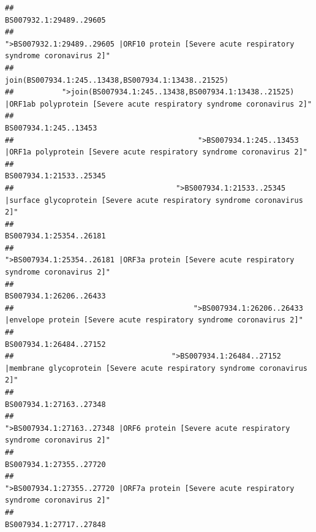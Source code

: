 \documentclass[
]{article}
\begin{document}
\begin{verbatim}
##                                                                                                                BS007932.1:29489..29605 
##                                            ">BS007932.1:29489..29605 |ORF10 protein [Severe acute respiratory syndrome coronavirus 2]" 
##                                                                                    join(BS007934.1:245..13438,BS007934.1:13438..21525) 
##           ">join(BS007934.1:245..13438,BS007934.1:13438..21525) |ORF1ab polyprotein [Severe acute respiratory syndrome coronavirus 2]" 
##                                                                                                                  BS007934.1:245..13453 
##                                          ">BS007934.1:245..13453 |ORF1a polyprotein [Severe acute respiratory syndrome coronavirus 2]" 
##                                                                                                                BS007934.1:21533..25345 
##                                     ">BS007934.1:21533..25345 |surface glycoprotein [Severe acute respiratory syndrome coronavirus 2]" 
##                                                                                                                BS007934.1:25354..26181 
##                                            ">BS007934.1:25354..26181 |ORF3a protein [Severe acute respiratory syndrome coronavirus 2]" 
##                                                                                                                BS007934.1:26206..26433 
##                                         ">BS007934.1:26206..26433 |envelope protein [Severe acute respiratory syndrome coronavirus 2]" 
##                                                                                                                BS007934.1:26484..27152 
##                                    ">BS007934.1:26484..27152 |membrane glycoprotein [Severe acute respiratory syndrome coronavirus 2]" 
##                                                                                                                BS007934.1:27163..27348 
##                                             ">BS007934.1:27163..27348 |ORF6 protein [Severe acute respiratory syndrome coronavirus 2]" 
##                                                                                                                BS007934.1:27355..27720 
##                                            ">BS007934.1:27355..27720 |ORF7a protein [Severe acute respiratory syndrome coronavirus 2]" 
##                                                                                                                BS007934.1:27717..27848 

\end{verbatim}
\end{document}
